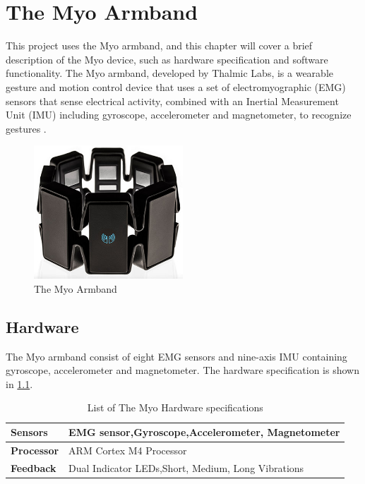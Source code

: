 \chapter{The Myo Armband}
\label{chap:myo}
This project uses the Myo armband, and this chapter will cover a brief description of the Myo device, such as hardware specification and software functionality. The Myo armband, developed by Thalmic Labs, is a wearable gesture and motion control device that uses a set of electromyographic (EMG) sensors that sense electrical activity, combined with an Inertial Measurement Unit (IMU) including gyroscope, accelerometer and magnetometer, to recognize gestures \cite{myo}.

\begin{figure}[ht]
    \centering
    \includegraphics[height=5cm]{images/myoarmband.jpg}
    \caption[The Myo Armband]{The Myo Armband}
    \label{fig:myoarmband}
\end{figure}


\section{Hardware}
The Myo armband consist of eight EMG sensors and nine-axis IMU containing gyroscope, accelerometer and magnetometer. The hardware specification is shown in \cref{table:myo_hardware}.

\begin{table}[ht!]
\centering
    \begin{tabular}{ | l | p{8cm} |}
        \hline
        \textbf{Sensors} & EMG sensor,\newline Gyroscope,\newline Accelerometer, \newline Magnetometer\\ \hline
        
        \textbf{Processor} & ARM Cortex M4 Processor  \\ \hline
        
        \textbf{Feedback} & Dual Indicator LEDs,\newline Short, Medium, Long Vibrations  \\ \hline
    \end{tabular}
    \caption[The Myo Hardware]{List of The Myo Hardware specifications}
    \label{table:myo_hardware}
\end{table}

